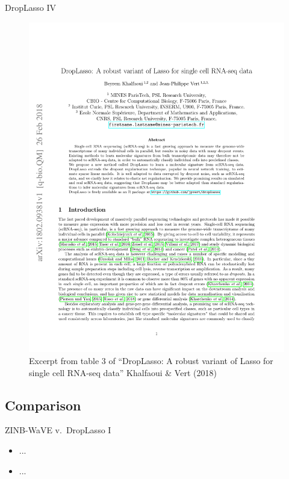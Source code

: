 \documentclass{beamer}
\begin{document}
\begin{frame}{DropLasso IV}

\begin{figure}[H]
  \includegraphics[width=\textwidth]{droplasso}
  \caption{Excerpt from table 3 of ``DropLasso: A robust variant of Lasso for
    single cell RNA-seq data'' Khalfaoui \& Vert (2018)}
\end{figure}

\end{frame}

\subsection{Comparison}

\begin{frame}{ZINB-WaVE v.~DropLasso I}

\begin{itemize}
  \itemsep12pt
  \item ...
  \item ...
\end{itemize}

\end{frame}
\end{document}
